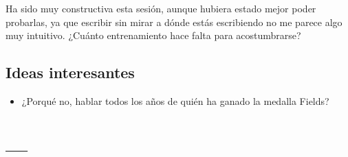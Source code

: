 \documentclass[palatino,nochap]{apuntes}
\begin{document}
Ha sido muy constructiva esta sesión, aunque hubiera estado mejor poder probarlas, ya que escribir sin mirar a dónde estás escribiendo no me parece algo muy intuitivo. 
%
¿Cuánto entrenamiento hace falta para acostumbrarse?


\section{Ideas interesantes}

\begin{itemize}
	\item ¿Porqué no, hablar todos los años de quién ha ganado la medalla Fields?
\end{itemize}







\appendix

\chapter{---}


\printindex
\end{document}
